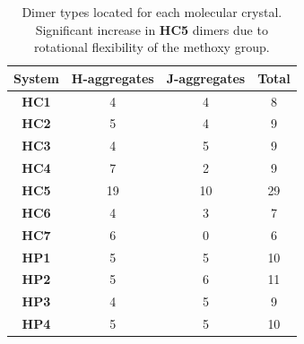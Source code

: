 \begin{table}[t]
\centering
\caption[Dimer types for \textbf{HC} and \textbf{HP} molecular crystals]{Dimer types located for each molecular crystal. Significant increase in \textbf{HC5} dimers due to rotational flexibility of the methoxy group.} 
  \label{table: dimer_types}
  \begin{tabular}{cccc}
  \hline
  System & H-aggregates & J-aggregates & Total\\
  \hline
  \textbf{HC1} & 4 & 4 & 8\\
  \textbf{HC2} & 5 & 4 & 9 \\
  \textbf{HC3} & 4 & 5 & 9\\
  \textbf{HC4} & 7 & 2 & 9\\
  \textbf{HC5} & 19 & 10 & 29 \\
  \textbf{HC6} & 4 & 3 & 7\\
  \textbf{HC7} & 6 & 0 & 6\\
  \hline
  \textbf{HP1} & 5 & 5 & 10\\
  \textbf{HP2} & 5 & 6 & 11\\
  \textbf{HP3} & 4 & 5 & 9\\
  \textbf{HP4} & 5 & 5 & 10\\
  \hline
  \end{tabular}
\end{table}

